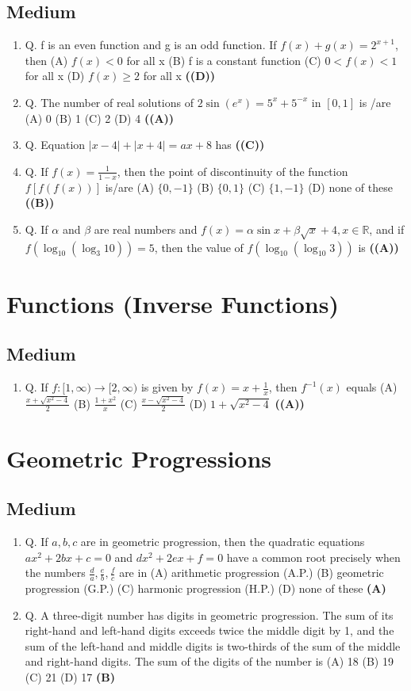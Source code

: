 \documentclass{article}
\begin{document}
\subsection{Medium}
\begin{enumerate}
\item Q. f is an even function and g is an odd function. If $f(x) + g(x) = 2^{x+1}$, then
(A) $f(x) < 0$ for all x
(B) f is a constant function
(C) $0 < f(x) < 1$ for all x
(D) $f(x) \ge 2$ for all x \hfill \textbf{((D))}
\item Q. The number of real solutions of $2 \sin (e^x) = 5^x + 5^{-x}$ in $[0, 1]$ is /are
(A) 0
(B) 1
(C) 2
(D) 4 \hfill \textbf{((A))}
\item Q. Equation $|x - 4| + |x + 4| = ax + 8$ has \hfill \textbf{((C))}
\item Q. If $f(x) = \frac{1}{1-x}$, then the point of discontinuity of the function $f[f(f(x))]$ is/are
(A) $\{0,-1\}$
(B) $\{0,1\}$
(C) $\{1,-1\}$
(D) none of these \hfill \textbf{((B))}
\item Q. If $\alpha$ and $\beta$ are real numbers and $f(x) = \alpha \sin x + \beta \sqrt{x} + 4, x \in \mathbb{R}$, and if $f(\log_{10}(\log_3 10)) = 5$, then the value of $f(\log_{10}(\log_{10} 3))$ is \hfill \textbf{((A))}
\end{enumerate}
\section{Functions (Inverse Functions)}
\subsection{Medium}
\begin{enumerate}
\item Q. If $f : [1,\infty) \to [2, \infty)$ is given by $f(x) = x + \frac{1}{x}$, then $f^{-1}(x)$ equals
(A) $\frac{x+\sqrt{x^2-4}}{2}$
(B) $\frac{1+x^2}{x}$
(C) $\frac{x-\sqrt{x^2-4}}{2}$
(D) $1 + \sqrt{x^2-4}$ \hfill \textbf{((A))}
\end{enumerate}
\section{Geometric Progressions}
\subsection{Medium}
\begin{enumerate}
\item Q. If $a, b, c$ are in geometric progression, then the quadratic equations
$ax^2 + 2bx + c = 0$ and $dx^2 + 2ex + f = 0$
have a common root precisely when the numbers $\frac{d}{a}, \frac{e}{b}, \frac{f}{c}$ are in
(A) arithmetic progression (A.P.)
(B) geometric progression (G.P.)
(C) harmonic progression (H.P.)
(D) none of these \hfill \textbf{(A)}
\item Q. A three-digit number has digits in geometric progression. The sum of its right-hand and left-hand digits exceeds twice the middle digit by 1, and the sum of the left-hand and middle digits is two-thirds of the sum of the middle and right-hand digits. The sum of the digits of the number is
(A) 18
(B) 19
(C) 21
(D) 17 \hfill \textbf{(B)}
\end{enumerate}
\end{document}

